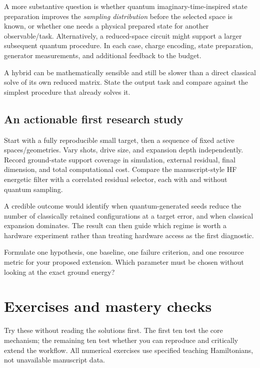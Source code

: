 \documentclass[11pt,a4paper,oneside]{report}
\newcommand{\checkpoint}[1]{\begin{idea}[Check your understanding]#1\end{idea}}
\begin{document}
A more substantive question is whether quantum imaginary-time-inspired state preparation improves the \emph{sampling distribution} before the selected space is known, or whether one needs a physical prepared state for another observable/task. Alternatively, a reduced-space circuit might support a larger subsequent quantum procedure. In each case, charge encoding, state preparation, generator measurements, and additional feedback to the budget.

\begin{caution}
A hybrid can be mathematically sensible and still be slower than a direct classical solve of its own reduced matrix. State the output task and compare against the simplest procedure that already solves it.
\end{caution}

\section{An actionable first research study}
Start with a fully reproducible small target, then a sequence of fixed active spaces/geometries. Vary shots, drive size, and expansion depth independently. Record ground-state support coverage in simulation, external residual, final dimension, and total computational cost. Compare the manuscript-style HF energetic filter with a correlated residual selector, each with and without quantum sampling.

A credible outcome would identify when quantum-generated seeds reduce the number of classically retained configurations at a target error, and when classical expansion dominates. The result can then guide which regime is worth a hardware experiment rather than treating hardware access as the first diagnostic.

\checkpoint{Formulate one hypothesis, one baseline, one failure criterion, and one resource metric for your proposed extension. Which parameter must be chosen without looking at the exact ground energy?}

\chapter{Exercises and mastery checks}\label{ch:exercises}
Try these without reading the solutions first. The first ten test the core mechanism; the remaining ten test whether you can reproduce and critically extend the workflow. All numerical exercises use specified teaching Hamiltonians, not unavailable manuscript data.
\end{document}
